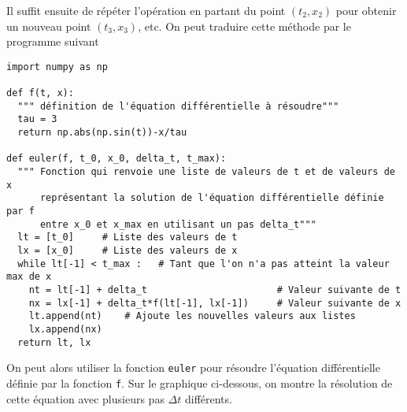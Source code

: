 \documentclass{cours}
\begin{document}
\begin{center}
\end{center}

Il suffit ensuite de répéter l'opération en partant du point $(t_2, x_2)$ pour obtenir un nouveau point $(t_3, x_3)$, etc. On peut traduire cette méthode par le programme suivant

\begin{verbatim}
import numpy as np

def f(t, x):
  """ définition de l'équation différentielle à résoudre"""
  tau = 3
  return np.abs(np.sin(t))-x/tau

def euler(f, t_0, x_0, delta_t, t_max):
  """ Fonction qui renvoie une liste de valeurs de t et de valeurs de x
      représentant la solution de l'équation différentielle définie par f
      entre x_0 et x_max en utilisant un pas delta_t"""
  lt = [t_0]     # Liste des valeurs de t
  lx = [x_0]     # Liste des valeurs de x
  while lt[-1] < t_max :   # Tant que l'on n'a pas atteint la valeur max de x
    nt = lt[-1] + delta_t                       # Valeur suivante de t
    nx = lx[-1] + delta_t*f(lt[-1], lx[-1])     # Valeur suivante de x
    lt.append(nt)    # Ajoute les nouvelles valeurs aux listes
    lx.append(nx)
  return lt, lx
\end{verbatim}

On peut alors utiliser la fonction \texttt{euler} pour résoudre l'équation différentielle définie par la fonction \texttt{f}. Sur le graphique ci-dessous, on montre la résolution de cette équation avec plusieurs pas $\Delta t$ différents.
\end{document}
